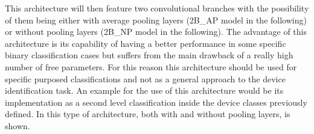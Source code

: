 This architecture will then feature two convolutional branches with the possibility of them being either with average pooling layers (2B\_AP model in the following) or without pooling layers (2B\_NP model in the following). The advantage of this architecture is its capability of having a better performance in some specific binary classification cases but suffers from the main drawback of a really high number of free parameters. For this reason this architecture should be used for specific purposed classifications and not as a general approach to the device identification task. An example for the use of this architecture would be its implementation as a second level classification inside the device classes previously defined. 
In  this type of architecture, both with and without pooling layers, is shown.

